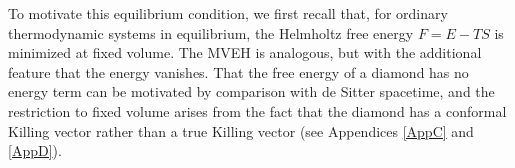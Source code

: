 \documentclass[aps,prd,showpacs,groupedaddress,nofootinbib,longbibliography,12pt]{revtex4-1}
\def\beq{\begin{equation}}
\def\eeq{\end{equation}}
\def\d{\delta}\def\D{\Delta}
\def\k{\kappa}
\begin{document}
To motivate this equilibrium condition,
we first recall that, 
for ordinary thermodynamic systems
in equilibrium, the Helmholtz free energy $F=E - TS$ is minimized at fixed volume.
The MVEH is analogous, but with the additional feature that the energy 
vanishes.
That the free energy of a diamond has no energy term can be motivated by 
comparison with de Sitter spacetime, and the restriction to fixed volume arises from 
the fact that the diamond has a conformal Killing vector rather than a true Killing vector (see Appendices \ref{AppC} and \ref{AppD}). 


\end{document}
